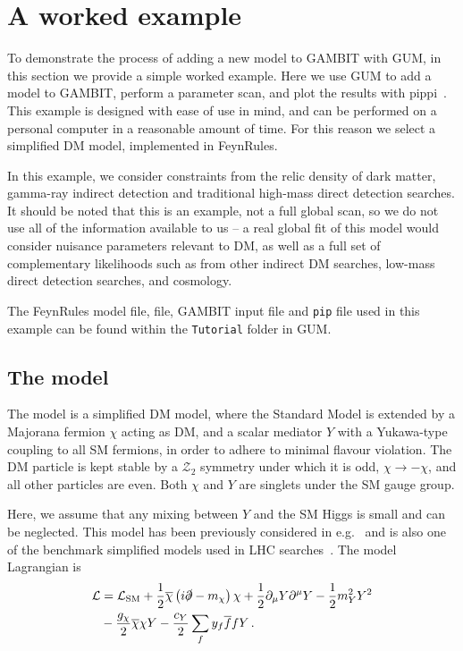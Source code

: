 \documentclass[pdftex,twocolumn,epjc3_preprint,runningheads]{svjour3}
\renewcommand{\_}{\discretionary{\underscore}{}{\underscore}}
\newcommand\term[1]{{\lstset{style=terminal}\lstinline!#1!\lstset{style=cpp}}}
\newcommand{\gambit}{\textsf{GAMBIT}\xspace}
\newcommand{\GB}{\gambit}
\newcommand\pippi{\textsf{pippi}\xspace}
\newcommand{\gum}{\textsf{GUM}\xspace}
\newcommand{\dgum}{\!\!\term{.gum}\!\xspace}
\newcommand{\fr}{\textsf{FeynRules}\xspace}
\begin{document}
\section{A worked example}\label{sec:example}

To demonstrate the process of adding a new model to \GB with \gum, in this section we provide a simple worked example.  Here we use \gum to add a model to \GB, perform a parameter scan, and plot the results with \pippi~\cite{pippi}. This example is designed with ease of use in mind, and can be performed on a personal computer in a reasonable amount of time. For this reason we select a simplified DM model, implemented in \fr.

In this example, we consider constraints from the relic density of dark matter, gamma-ray indirect detection and traditional high-mass direct detection searches.  It should be noted that this is an example, not a full global scan, so we do not use all of the information available to us -- a real global fit of this model would consider nuisance parameters relevant to DM, as well as a full set of complementary likelihoods such as from other indirect DM searches, low-mass direct detection searches, and cosmology.

The \fr model file, \dgum file, \gambit input file and \term{pip} file used in this example can be found within the \term{Tutorial} folder in \gum.

\subsection{The model}

The model is a simplified DM model, where the Standard Model is extended by a Majorana fermion $\chi$ acting as DM, and a scalar mediator $Y$ with a Yukawa-type coupling to all SM fermions, in order to adhere to minimal flavour violation. The DM particle is kept stable by a $\mathcal{Z}_2$ symmetry under which it is odd, $\chi \rightarrow -\chi$, and all other particles are even. Both $\chi$ and $Y$ are singlets under the SM gauge group.

Here, we assume that any mixing between $Y$ and the SM Higgs is small and can be neglected. This model has been previously considered in e.g.~\cite{Buckley:2014fba,Arcadi:2017kky} and is also one of the benchmark simplified models used in LHC searches~\cite{Abdallah:2015ter,Sirunyan:2019gfm,Aaboud:2019yqu}. The model Lagrangian is
%
\begin{align}
  \mathcal{L} &= \mathcal{L}_\mathrm{SM} + \frac{1}{2}\overline{\chi}\left(i\slashed{\partial}-m_\chi\right)\chi +\frac{1}{2}\partial_\mu Y \partial^\mu Y - \frac{1}{2} m_Y^2 Y^2 \nonumber\\
              &- \frac{g_\chi}{2} \overline{\chi}\chi Y -\frac{c_Y}{2} \sum_f y_f \overline{f} f Y \,.
\end{align}
\end{document}
